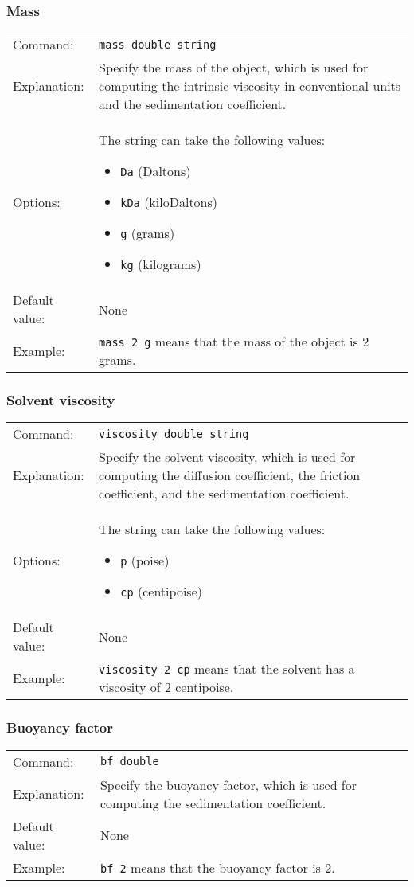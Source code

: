 \documentclass[12pt,letterpaper]{article}
\begin{document}
\subsubsection{Mass}
\begin{tabular}{p{1in} p{5.5in}}
Command: & \texttt{mass double string} \\ 
Explanation: & Specify the mass of the object, which is used for computing the intrinsic viscosity in conventional units and the sedimentation coefficient.\\
Options: & The string can take the following values:
\begin{itemize}
\item \texttt{Da} (Daltons)
\item \texttt{kDa} (kiloDaltons)
\item \texttt{g} (grams)
\item \texttt{kg} (kilograms)
\end{itemize} \\
Default value: & None \\
Example: & \texttt{mass 2 g} means that the mass of the object is 2 grams.
\end{tabular}

\subsubsection{Solvent viscosity}
\begin{tabular}{p{1in} p{5.5in}}
Command: & \texttt{viscosity double string} \\ 
Explanation: & Specify the solvent viscosity, which is used for computing the diffusion coefficient, the friction coefficient, and the sedimentation coefficient.\\
Options: & The string can take the following values:
\begin{itemize}
\item \texttt{p} (poise)
\item \texttt{cp} (centipoise)
\end{itemize} \\
Default value: & None \\
Example: & \texttt{viscosity 2 cp} means that the solvent has a viscosity of 2 centipoise.
\end{tabular}

\subsubsection{Buoyancy factor}
\begin{tabular}{p{1in} p{5.5in}}
Command: & \texttt{bf double} \\ 
Explanation: & Specify the buoyancy factor, which is used for computing the sedimentation coefficient.\\
Default value: & None \\
Example: & \texttt{bf 2} means that the buoyancy factor is 2.
\end{tabular}
\end{document}

